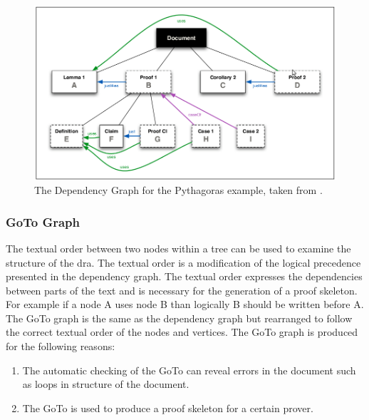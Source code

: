 \begin{figure}[H]
\begin{center}
\includegraphics[scale=0.45]{Figures/Background/pythdepgraph.png}
\end{center}
\caption{The Dependency Graph for the Pythagoras example, taken from \cite{zengfirstyear}. \label{fig:pydepgraph}}
\end{figure}

\subsubsection{GoTo Graph}

The textual order between two nodes within a tree can be used to examine the
structure of the \gls{dra}. The textual order is a modification of the logical
precedence presented in the dependency graph. The textual order expresses the
dependencies between parts of the text and is necessary for the generation of a
proof skeleton. For example if a node A uses node B than logically B should be
written before A. The GoTo graph is the same as the dependency graph but
rearranged to follow the correct textual order of the nodes and vertices. The
GoTo graph is produced for the following reasons:

\begin{enumerate}
\item The automatic checking of the GoTo can reveal errors in the document such
as loops in structure of the document.

\item The GoTo is used to produce a proof skeleton for a certain prover.
\end{enumerate}

